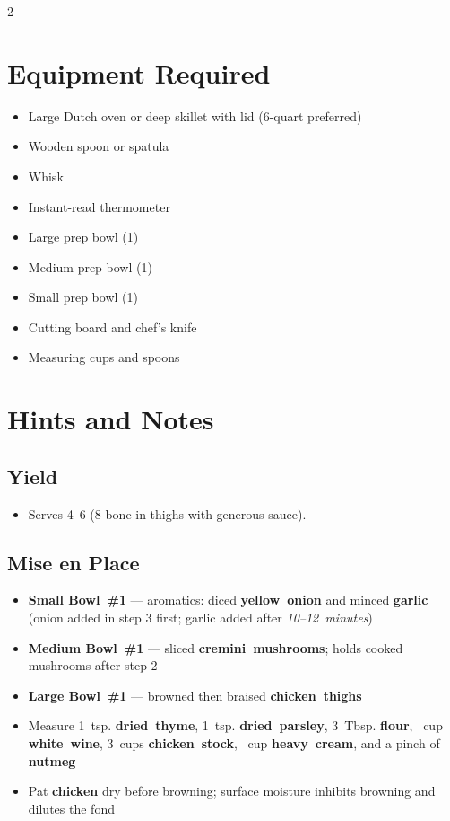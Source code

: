 \documentclass[11pt,letterpaper]{article}
\begin{document}
{\footnotesize
\setlength{\columnsep}{20pt}
\setlength{\multicolsep}{6pt}
\begin{multicols}{2}
\setlength{\parindent}{0pt}
\setlength{\parskip}{2pt}
\setlength{\itemsep}{0pt}
\setlength{\parsep}{0pt}

\section*{Equipment Required}
\begin{itemize}
    \item Large Dutch oven or deep skillet with lid (6-quart preferred)
    \item Wooden spoon or spatula
    \item Whisk
    \item Instant-read thermometer
    \item Large prep bowl (1)
    \item Medium prep bowl (1)
    \item Small prep bowl (1)
    \item Cutting board and chef's knife
    \item Measuring cups and spoons
\end{itemize}

\section*{Hints and Notes}

\subsection*{Yield}
\begin{itemize}
    \item Serves 4--6 (8 bone-in thighs with generous sauce).
\end{itemize}

\subsection*{Mise en Place}
\begin{itemize}
    \item \textbf{Small Bowl~\#1} --- aromatics: diced \textbf{yellow~onion} and minced \textbf{garlic} (onion added in step 3 first; garlic added after \textit{10--12~minutes})
    \item \textbf{Medium Bowl~\#1} --- sliced \textbf{cremini~mushrooms}; holds cooked mushrooms after step 2
    \item \textbf{Large Bowl~\#1} --- browned then braised \textbf{chicken~thighs}
    \item Measure 1~tsp. \textbf{dried~thyme}, 1~tsp. \textbf{dried~parsley}, 3~Tbsp. \textbf{flour}, ~cup \textbf{white~wine}, 3~cups \textbf{chicken~stock}, ~cup \textbf{heavy~cream}, and a pinch of \textbf{nutmeg}
    \item Pat \textbf{chicken} dry before browning; surface moisture inhibits browning and dilutes the fond
\end{itemize}


\end{multicols}}
\end{document}
